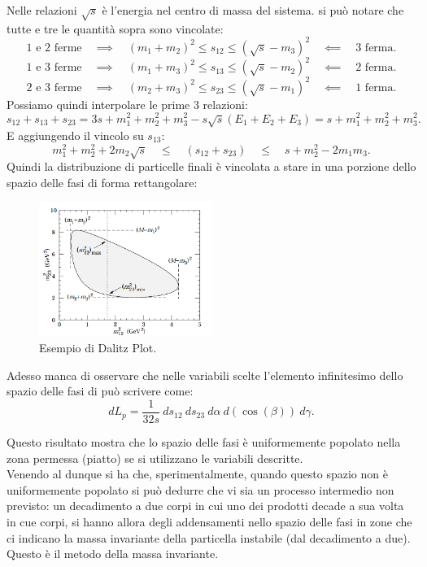 Nelle relazioni $\sqrt{s}$ è l'energia nel centro di massa del sistema. si può notare che tutte e tre le quantità sopra sono vincolate:
\[
	\text{1 e 2 ferme} \quad \implies \quad \left( m_1 + m_2 \right)^2 \le s_{12} \le \left( \sqrt{s} - m_3 \right)^2 \quad \impliedby \quad \text{3 ferma}  
.\]
\[
	\text{1 e 3 ferme} \quad \implies \quad \left( m_1 + m_3 \right)^2 \le s_{13} \le \left( \sqrt{s} - m_2 \right)^2 \quad \impliedby \quad \text{2 ferma}  
.\] 
\[
	\text{2 e 3 ferme} \quad \implies \quad \left( m_2 + m_3 \right)^2 \le s_{23} \le \left( \sqrt{s} - m_1 \right)^2 \quad \impliedby \quad \text{1 ferma}  
.\] 
Possiamo quindi interpolare le prime 3 relazioni:
\[
	s_{12} + s_{13} + s_{23} = 3s + m_1^2 + m_2^2 + m_3^2 - s \sqrt{s}\left( E_1 + E_2 + E_3 \right) = s + m_1^2 + m_2^2 + m_3^2   
.\] 
E aggiungendo il vincolo su $s_{13}$:
\[
	m_1^2 + m_2^2 + 2m_2 \sqrt{s} \quad \le \quad  ( s_{12} + s_{23} ) \quad  \le  \quad  s + m_2^2 - 2m_1 m_3 
.\] 
Quindi la distribuzione di particelle finali è vincolata a stare in una porzione dello spazio delle fasi di forma rettangolare:
\begin{figure}[H]
	\centering
	\includegraphics[width=0.5\textwidth]{immagini/Dalitz.png}
	\caption{Esempio di Dalitz Plot.}
	\label{fig:Dalitz}
\end{figure}
Adesso manca di osservare che nelle variabili scelte l'elemento infinitesimo dello spazio delle fasi di può scrivere come:
\[
	dL_p = \frac{1}{32s} \ ds_{12} \ ds_{23} \ d\alpha \ d\left( \cos(\beta) \right) \ d\gamma 
.\] 

Questo risultato mostra che lo spazio delle fasi è uniformemente popolato nella zona permessa (piatto) se si utilizzano le variabili descritte.\\

Venendo al dunque si ha che, sperimentalmente, quando questo spazio non è uniformemente popolato si può dedurre che vi sia un processo intermedio non previsto: un decadimento a due corpi in cui uno dei prodotti decade a sua volta in cue corpi, si hanno allora degli addensamenti nello spazio delle fasi in zone che ci indicano la massa invariante della particella instabile (dal decadimento a due). Questo è il metodo della massa invariante.



